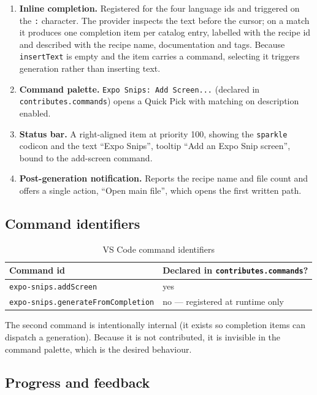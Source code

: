 \begin{enumerate}
  \item \textbf{Inline completion.} Registered for the four language ids and
        triggered on the \texttt{:} character. The provider inspects the text before
        the cursor; on a match it produces one completion item per catalog entry,
        labelled with the recipe id and described with the recipe name,
        documentation and tags. Because \texttt{insertText} is empty and the item
        carries a command, selecting it triggers generation rather than inserting
        text.
  \item \textbf{Command palette.} \texttt{Expo Snips: Add Screen...} (declared in
        \texttt{contributes.commands}) opens a Quick Pick with matching on
        description enabled.
  \item \textbf{Status bar.} A right-aligned item at priority 100, showing the
        \texttt{sparkle} codicon and the text ``Expo Snips'', tooltip ``Add an Expo
        Snip screen'', bound to the add-screen command.
  \item \textbf{Post-generation notification.} Reports the recipe name and file
        count and offers a single action, ``Open main file'', which opens the first
        written path.
\end{enumerate}

\subsection*{Command identifiers}

\begin{table}[H]
\centering
\caption{VS Code command identifiers}
\begin{tabular}{p{6cm}p{7.6cm}}
\toprule
\textbf{Command id} & \textbf{Declared in \texttt{contributes.commands}?} \\
\midrule
\texttt{expo-snips.addScreen} & yes \\
\texttt{expo-snips.generateFromCompletion} & no --- registered at runtime only \\
\bottomrule
\end{tabular}
\end{table}

The second command is intentionally internal (it exists so completion items can
dispatch a generation). Because it is not contributed, it is invisible in the
command palette, which is the desired behaviour.

\subsection*{Progress and feedback}

